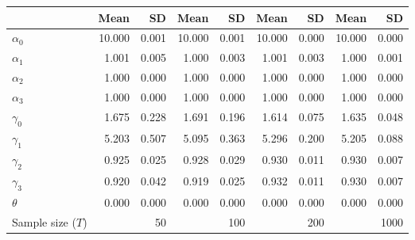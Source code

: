 
\begin{tabular}[t]{lrrrrrrrr}
\toprule
  & Mean & SD & Mean  & SD  & Mean   & SD   & Mean    & SD   \\
\midrule
$\alpha_{0}$ & 10.000 & 0.001 & 10.000 & 0.001 & 10.000 & 0.000 & 10.000 & 0.000\\
$\alpha_{1}$ & 1.001 & 0.005 & 1.000 & 0.003 & 1.001 & 0.003 & 1.000 & 0.001\\
$\alpha_{2}$ & 1.000 & 0.000 & 1.000 & 0.000 & 1.000 & 0.000 & 1.000 & 0.000\\
$\alpha_{3}$ & 1.000 & 0.000 & 1.000 & 0.000 & 1.000 & 0.000 & 1.000 & 0.000\\
$\gamma_{0}$ & 1.675 & 0.228 & 1.691 & 0.196 & 1.614 & 0.075 & 1.635 & 0.048\\
$\gamma_{1}$ & 5.203 & 0.507 & 5.095 & 0.363 & 5.296 & 0.200 & 5.205 & 0.088\\
$\gamma_{2}$ & 0.925 & 0.025 & 0.928 & 0.029 & 0.930 & 0.011 & 0.930 & 0.007\\
$\gamma_{3}$ & 0.920 & 0.042 & 0.919 & 0.025 & 0.932 & 0.011 & 0.930 & 0.007\\
$\theta$ & 0.000 & 0.000 & 0.000 & 0.000 & 0.000 & 0.000 & 0.000 & 0.000\\
Sample size ($T$) &  & 50 &  & 100 &  & 200 &  & 1000\\
\bottomrule
\end{tabular}
